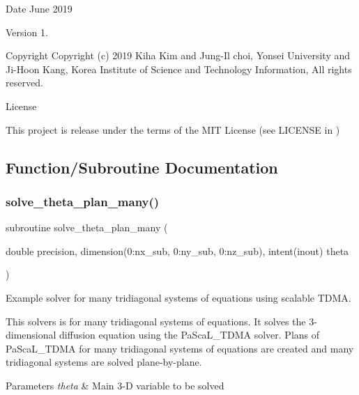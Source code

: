 \begin{DoxyDate}{Date}
June 2019 
\end{DoxyDate}
\begin{DoxyVersion}{Version}
1. 
\end{DoxyVersion}
\begin{DoxyParagraph}{Copyright}
Copyright (c) 2019 Kiha Kim and Jung-\/\+Il choi, Yonsei University and Ji-\/\+Hoon Kang, Korea Institute of Science and Technology Information, All rights reserved. 
\end{DoxyParagraph}
\begin{DoxyParagraph}{License }

\end{DoxyParagraph}
This project is release under the terms of the M\+IT License (see L\+I\+C\+E\+N\+SE in ) 

\subsection{Function/\+Subroutine Documentation}
\mbox{\label{solve__theta__plan__many_8f90_af048018fcdfbe66e00922dee3e7e9a64}} 
\subsubsection{\texorpdfstring{solve\_theta\_plan\_many()}{solve\_theta\_plan\_many()}}
{\footnotesize\ttfamily subroutine solve\+\_\+theta\+\_\+plan\+\_\+many (\begin{DoxyParamCaption}\item[{double precision, dimension(0\+:nx\+\_\+sub, 0\+:ny\+\_\+sub, 0\+:nz\+\_\+sub), intent(inout)}]{theta }\end{DoxyParamCaption})}



Example solver for many tridiagonal systems of equations using scalable T\+D\+MA. 

This solvers is for many tridiagonal systems of equations. It solves the 3-\/dimensional diffusion equation using the Pa\+Sca\+L\+\_\+\+T\+D\+MA solver. Plans of Pa\+Sca\+L\+\_\+\+T\+D\+MA for many tridiagonal systems of equations are created and many tridiagonal systems are solved plane-\/by-\/plane. 
\begin{DoxyParams}{Parameters}
{\em theta} & Main 3-\/D variable to be solved \\
\hline
\end{DoxyParams}


